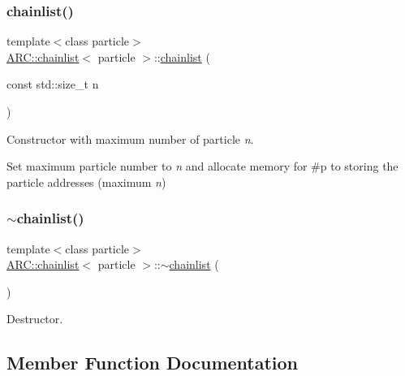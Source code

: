 \subsubsection{\texorpdfstring{chainlist()}{chainlist()}\hspace{0.1cm}{\footnotesize\ttfamily [2/2]}}
{\footnotesize\ttfamily template$<$class particle$>$ \\
\hyperlink{classARC_1_1chainlist}{A\+R\+C\+::chainlist}$<$ particle $>$\+::\hyperlink{classARC_1_1chainlist}{chainlist} (\begin{DoxyParamCaption}\item[{const std\+::size\+\_\+t}]{n }\end{DoxyParamCaption})\hspace{0.3cm}{\ttfamily [inline]}}



Constructor with maximum number of particle {\itshape n}. 

Set maximum particle number to {\itshape n} and allocate memory for \#p to storing the particle addresses (maximum {\itshape n}) \hypertarget{classARC_1_1chainlist_ab24d982dbeee6269f2912747db6f9be4}{}\label{classARC_1_1chainlist_ab24d982dbeee6269f2912747db6f9be4} 
\subsubsection{\texorpdfstring{$\sim$chainlist()}{~chainlist()}}
{\footnotesize\ttfamily template$<$class particle$>$ \\
\hyperlink{classARC_1_1chainlist}{A\+R\+C\+::chainlist}$<$ particle $>$\+::$\sim$\hyperlink{classARC_1_1chainlist}{chainlist} (\begin{DoxyParamCaption}{ }\end{DoxyParamCaption})\hspace{0.3cm}{\ttfamily [inline]}}



Destructor. 



\subsection{Member Function Documentation}
\hypertarget{classARC_1_1chainlist_afa780edfa301cc22cf189e63d7a59c2c}{}\label{classARC_1_1chainlist_afa780edfa301cc22cf189e63d7a59c2c} 
